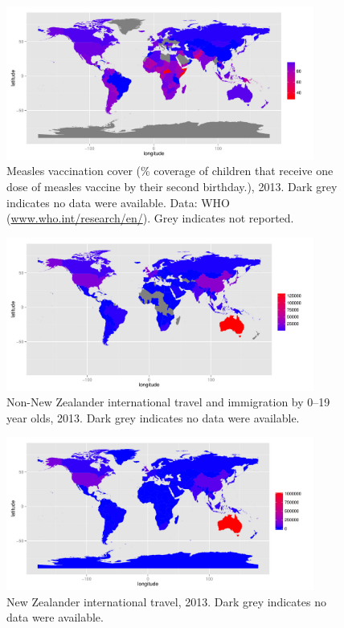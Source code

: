 \documentclass{article}
\begin{document}
\begin{figure}
\begin{center}
     \includegraphics[width=0.9\textwidth]{2013totnp3.pdf}
\end{center}
\caption{Measles vaccination cover (\% coverage of children that receive one dose of measles vaccine by their second birthday.), 2013. Dark grey indicates no data were available. Data: WHO (\href{http://www.who.int/research/en/}{www.who.int/research/en/}). Grey indicates not reported.}
\label{fig:cover12}
\end{figure}

\begin{figure}
\begin{center}
     \includegraphics[width=0.9\textwidth]{2013np1.pdf}
\end{center}
\caption{Non-New Zealander international travel and immigration by 0--19 year olds, 2013. Dark grey indicates no data were available.}
\label{fig:immigration12}
\end{figure}

\begin{figure}
\begin{center}
     \includegraphics[width=0.9\textwidth]{2013nznp1.pdf}
\end{center}
\caption{New Zealander international travel, 2013. Dark grey indicates no data were available.}
\label{fig:nztravel12}
\end{figure}
\end{document}

